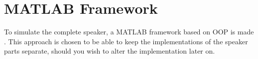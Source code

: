 
\chapter{MATLAB Framework}
To simulate the complete speaker, a MATLAB framework based on OOP is made \cite{MatlabClasses}. This approach is chosen to be able to keep the implementations of the speaker parts separate, should you wish to alter the implementation later on.




%